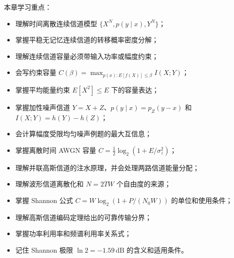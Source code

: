 本章学习重点：
\begin{itemize}
  \item 理解时间离散连续信道模型 $\{X^N,p(y\mid x),Y^N\}$；
  \item 掌握平稳无记忆连续信道的转移概率密度分解；
  \item 理解连续信道容量必须带输入功率或幅度约束；
  \item 会写约束容量 $C(\beta)=\max_{p(x):E[f(X)]\le\beta}I(X;Y)$；
  \item 掌握平均能量约束 $E[X^2]\le E$ 下的容量表达；
  \item 掌握加性噪声信道 $Y=X+Z$、$p(y\mid x)=p_Z(y-x)$ 和 $I(X;Y)=h(Y)-h(Z)$；
  \item 会计算幅度受限均匀噪声例题的最大互信息；
  \item 掌握离散时间 AWGN 容量 $C=\frac12\log_2(1+E/\sigma_z^2)$；
  \item 理解并联高斯信道的注水原理，并会处理两路信道能量分配；
  \item 理解波形信道离散化和 $N=2TW$ 个自由度的来源；
  \item 掌握 Shannon 公式 $C=W\log_2(1+P/(N_0W))$ 的单位和使用条件；
  \item 理解高斯信道编码定理给出的可靠传输分界；
  \item 掌握功率利用率和频谱利用率关系式；
  \item 记住 Shannon 极限 $\ln2=-1.59\,\mathrm{dB}$ 的含义和适用条件。
\end{itemize}
